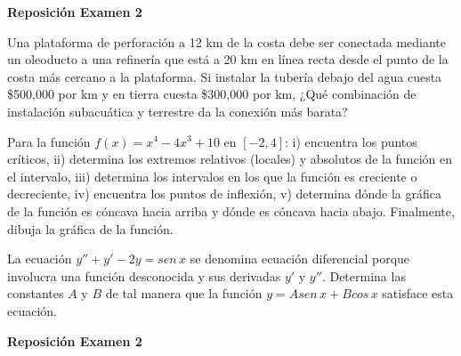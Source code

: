 \documentclass[12pt]{exam}
\begin{document}
\newpage

\begin{center}
\Large 
\textbf{Reposición Examen 2}
\end{center}{}
\normalsize

\begin{questions}
    \question Una plataforma de perforación a 12 km de la costa debe ser conectada mediante un oleoducto a una refinería que está a 20 km en línea recta desde el punto de la costa más cercano a la plataforma. Si instalar la tubería debajo del agua cuesta \$500,000 por km y en tierra cuesta \$300,000 por km, ¿Qué combinación de instalación subacuática y terrestre da la conexión más barata?

\vskip10pt
\question Para la función $f(x)=x^4-4x^3+10$ en $[-2,4]$: i) encuentra los puntos críticos, ii) determina los extremos relativos (locales) y absolutos de la función en el intervalo, iii) determina los intervalos en los que la función es creciente o decreciente, iv) encuentra los puntos de inflexión, v) determina dónde la gráfica de la función es cóncava hacia arriba y dónde es cóncava hacia abajo. Finalmente, dibuja la gráfica de la función.

\question La ecuación $y''+y'-2y=sen\,x$ se denomina ecuación diferencial porque involucra una función desconocida y sus derivadas $y'$ y $y''$. Determina las constantes $A$ y $B$ de tal manera que la función $y=Asen\,x+Bcos\,x$ satisface esta ecuación.

    \end{questions}

\vskip30pt

\begin{center}
\Large
\textbf{Reposición Examen 2}
\end{center}{}
\normalsize
\end{document}
